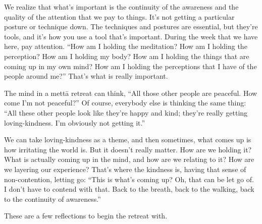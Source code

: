 We realize that what’s important is the continuity of the awareness and
the quality of the attention that we pay to things. It’s not getting a
particular posture or technique down. The techniques and postures are
essential, but they’re tools, and it’s how you use a tool that’s
important. During the week that we have here, pay attention. “How am I
holding the meditation? How am I holding the perception? How am I
holding my body? How am I holding the things that are coming up in my
own mind? How am I holding the perceptions that I have of the people
around me?” That’s what is really important.

The mind in a mettā retreat can think, “All those other people are
peaceful. How come I’m not peaceful?” Of course, everybody else is
thinking the same thing: “All these other people look like they’re happy
and kind; they’re really getting loving-kindness. I’m obviously not
getting it.”

We can take loving-kindness as a theme, and then sometimes, what comes
up is how irritating the world is. But it doesn’t really matter. How are
we holding it? What is actually coming up in the mind, and how are we
relating to it? How are we layering our experience? That’s where the
kindness is, having that sense of non-contention, letting go: “This is
what’s coming up? Oh, that can be let go of. I don’t have to contend
with that. Back to the breath, back to the walking, back to the
continuity of awareness.”

These are a few reflections to begin the retreat with.

